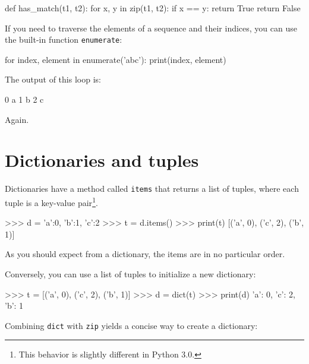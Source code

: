 
\beforeverb
\begin{pycode}
def has_match(t1, t2):
    for x, y in zip(t1, t2):
        if x == y:
            return True
    return False
\end{pycode}
\afterverb
%
If you need to traverse the elements of a sequence and their
indices, you can use the built-in function {\tt enumerate}:


\beforeverb
\begin{pycode}
for index, element in enumerate('abc'):
    print(index, element)
\end{pycode}
\afterverb
%
The output of this loop is:

\beforeverb
\begin{pyoutput}
0 a
1 b
2 c
\end{pyoutput}
\afterverb
%
Again.


\section{Dictionaries and tuples}


Dictionaries have a method called {\tt items} that returns a list of
tuples, where each tuple is a key-value pair\footnote{This behavior is
  slightly different in Python 3.0.}.

\beforeverb
\begin{pycode}
>>> d = {'a':0, 'b':1, 'c':2}
>>> t = d.items()
>>> print(t)
[('a', 0), ('c', 2), ('b', 1)]
\end{pycode}
\afterverb
%
As you should expect from a dictionary, the items are in no
particular order.


Conversely, you can use a list of tuples to initialize
a new dictionary:

\beforeverb
\begin{pycode}
>>> t = [('a', 0), ('c', 2), ('b', 1)]
>>> d = dict(t)
>>> print(d)
{'a': 0, 'c': 2, 'b': 1}
\end{pycode}
\afterverb

Combining {\tt dict} with {\tt zip} yields a concise way
to create a dictionary:


